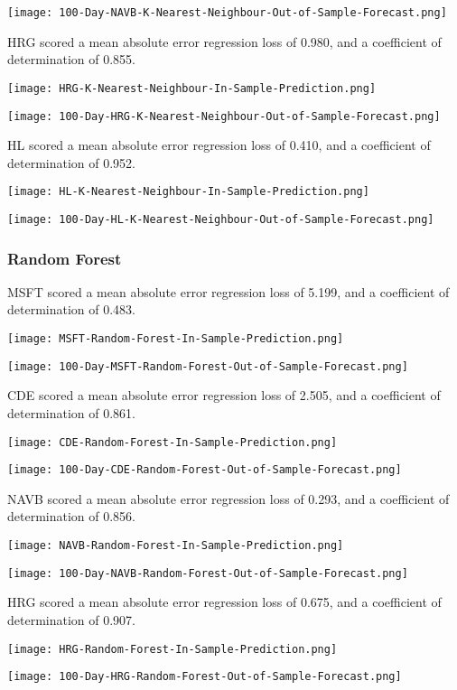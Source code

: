 \texttt{[image: 100-Day-NAVB-K-Nearest-Neighbour-Out-of-Sample-Forecast.png]}

HRG scored a mean absolute error regression loss of 0.980, and a coefficient of determination of 0.855.

\texttt{[image: HRG-K-Nearest-Neighbour-In-Sample-Prediction.png]}

\texttt{[image: 100-Day-HRG-K-Nearest-Neighbour-Out-of-Sample-Forecast.png]}

HL scored a mean absolute error regression loss of 0.410, and a coefficient of determination of 0.952.

\texttt{[image: HL-K-Nearest-Neighbour-In-Sample-Prediction.png]}

\texttt{[image: 100-Day-HL-K-Nearest-Neighbour-Out-of-Sample-Forecast.png]}

\subsubsection{Random Forest}
MSFT scored a mean absolute error regression loss of 5.199, and a coefficient of determination of 0.483.

\texttt{[image: MSFT-Random-Forest-In-Sample-Prediction.png]}

\texttt{[image: 100-Day-MSFT-Random-Forest-Out-of-Sample-Forecast.png]}

CDE scored a mean absolute error regression loss of 2.505, and a coefficient of determination of 0.861.

\texttt{[image: CDE-Random-Forest-In-Sample-Prediction.png]}

\texttt{[image: 100-Day-CDE-Random-Forest-Out-of-Sample-Forecast.png]}

NAVB scored a mean absolute error regression loss of 0.293, and a coefficient of determination of 0.856.

\texttt{[image: NAVB-Random-Forest-In-Sample-Prediction.png]}

\texttt{[image: 100-Day-NAVB-Random-Forest-Out-of-Sample-Forecast.png]}

HRG scored a mean absolute error regression loss of 0.675, and a coefficient of determination of 0.907.

\texttt{[image: HRG-Random-Forest-In-Sample-Prediction.png]}

\texttt{[image: 100-Day-HRG-Random-Forest-Out-of-Sample-Forecast.png]}


